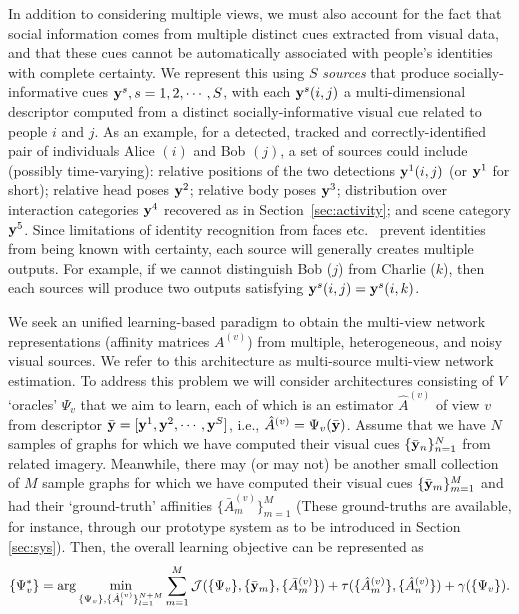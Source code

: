 In addition to considering multiple views, we must also account for the fact that social information comes from multiple distinct cues extracted from visual data, and that these cues cannot be automatically associated with people's identities with complete certainty. We represent this using $S$ \emph{sources} that produce socially-informative cues ${\bf y}^s, s=1,2,\cdots,S$, with each ${\bf y}^s(i,j)$ a multi-dimensional descriptor computed from a distinct socially-informative visual cue related to people $i$ and $j$. As an example, for a detected, tracked and correctly-identified pair of individuals Alice $(i)$ and Bob $(j)$, a set of sources could include (possibly time-varying): relative positions of the two detections ${\bf y}^1(i,j)$ (or ${\bf y}^1$ for short);  relative head poses ${\bf y}^2$; relative body poses ${\bf y}^3$; distribution over interaction categories ${\bf y}^4$ recovered as in Section~\ref{sec:activity}; and scene category ${\bf y}^5$. Since limitations of identity recognition from faces etc.~ prevent identities from being known with certainty, each source will generally creates multiple outputs. For example, if we cannot distinguish Bob ($j$) from Charlie ($k$), then each sources will produce two outputs satisfying ${\bf y}^s(i,j)={\bf y}^s(i,k)$. 

We seek an unified learning-based paradigm to obtain the multi-view network representations (affinity matrices $A^{(v)}$) from multiple, heterogeneous, and noisy visual sources. We refer to this architecture as multi-source multi-view network estimation. To address this problem we will consider architectures consisting of $V$ `oracles' $\Psi_{v}$ that we aim to learn, each of which is an estimator $\hat{A}^{(v)}$ of view $v$ from descriptor $\bar{{\bf y}}=[{\bf y}^1,{\bf y}^2, \cdots,{\bf y}^S]$, i.e., $\hat{A}^{(v)}=\Psi_{v}(\bar{{\bf y}})$. Assume that we have $N$ samples of graphs for which we have computed their visual cues $\{\bar{{\bf y}}_{n}\}_{n=1}^{N}$  from related imagery. Meanwhile, there may (or may not) be another small collection of $M$ sample graphs for which we have computed their visual cues $\{\bar{{\bf y}}_{m}\}_{m=1}^{M}$ and had their `ground-truth' affinities $\{\bar{A}^{(v)}_{m}\}_{m=1}^{M}$ (These ground-truths are available, for instance, through our prototype system as to be introduced in Section \ref{sec:sys}). Then, the overall learning objective can be represented as 
\begin{equation}\label{eq:sensing}
\{\Psi^{*}_{v}\}=\arg\min_{\{\Psi_{v}\},\{\hat{A}^{(v)}_l\}_{l=1}^{N+M}}\sum_{m=1}^{M}\mathcal{J}(\{\Psi_{v}\}, \{\bar{{\bf y}}_m\}, \{\bar{A}^{(v)}_m\})+\tau(\{\hat{A}^{(v)}_m\},\{\hat{A}^{(v)}_n\})+\gamma(\{\Psi_{v}\}).
 \end{equation}
 
